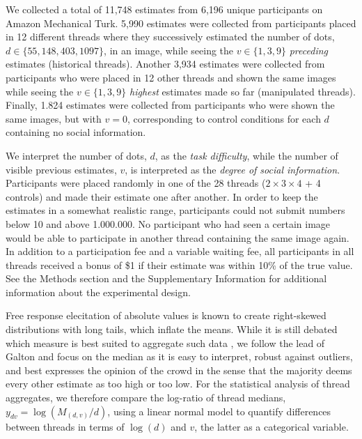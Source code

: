\documentclass[9pt,a4paper,twocolumn,lineno]{article}
\begin{document}
We collected a total of 11,748 estimates from 6,196 unique participants on Amazon Mechanical Turk. 5,990 estimates were collected from participants placed in 12 different threads where they successively estimated the number of dots, $d \in \{55,148,403,1097\}$, in an image, while seeing the $v \in \{1,3,9\}$ \textit{preceding} estimates (historical threads). Another 3,934 estimates were collected from participants who were placed in 12 other threads and shown the same images while seeing the $v \in \{1,3,9\}$ \textit{highest} estimates made so far (manipulated threads). Finally, 1.824 estimates were collected from participants who were shown the same images, but with $v=0$, corresponding to control conditions for each $d$ containing no social information. 

We interpret the number of dots, $d$, as the \textit{task difficulty}, while the number of visible previous estimates, $v$, is interpreted as the \textit{degree of social information}. Participants were placed randomly in one of the 28 threads ($2 \times 3 \times 4$ + 4 controls)  and made their estimate one after another. In order to keep the estimates in a somewhat realistic range, participants could not submit numbers below 10 and above 1.000.000. No participant who had seen a certain image would be able to participate in another thread containing the same image again. In addition to a participation fee and a variable waiting fee, all participants in all threads received a bonus of \$1 if their estimate was within 10\% of the true value. See the Methods section and the Supplementary Information for additional information about the experimental design.

Free response elecitation of absolute values is known to create right-skewed distributions with long tails, which inflate the means. While it is still debated which measure is best suited to aggregate such data \cite{kao2018counteracting}, we follow the lead of Galton \cite{galton1907vox} and focus on the median as it is easy to interpret, robust against outliers, and best expresses the opinion of the crowd in the sense that the majority deems every other estimate as too high or too low. For the statistical analysis of thread aggregates, we therefore compare the log-ratio of thread medians, $y_{dv}=\log(M_{(d,v)}/d)$, using a linear normal model to quantify differences between threads in terms of $\log(d)$ and $v$, the latter as a categorical variable. 
\end{document}
